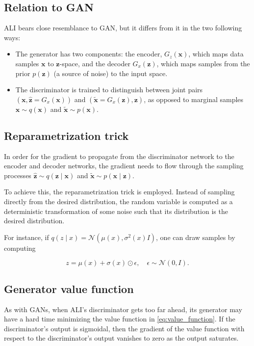 \documentclass{article}
\begin{document}
\subsection{Relation to GAN}
ALI bears close resemblance to GAN, but it differs from it in the two following
ways:

\begin{itemize}
	\item The generator has two components: the encoder, $G_z(\bm{x})$, which
		maps data samples $\bm{x}$ to $\bm{z}$-space, and the decoder
		$G_x(\bm{z})$, which maps samples from the prior $p(\bm{z})$ (a source
		of noise) to the input space.
	\item The discriminator is trained to distinguish between joint pairs
		$(\bm{x}, \hat{\bm{z}} = G_x(\bm{x}))$ and $(\tilde{\bm{x}} =
		G_x(\bm{z}), \bm{z})$, as opposed to marginal samples $\bm{x} \sim
		q(\bm{x})$ and $\tilde{\bm{x}} \sim p(\bm{x})$.
\end{itemize}


\subsection{Reparametrization trick}
In order for the gradient to propagate from the discriminator network to the
encoder and decoder networks, the gradient needs to flow through the sampling
processes $\hat{\bm{z}} \sim q(\bm{z} \mid \bm{x})$ and $\tilde{\bm{x}} \sim
p(\bm{x} \mid \bm{z})$.

To achieve this, the reparametrization trick
\citep{kingma2013fast,bengio2013deep,bengio2013estimating} is employed. Instead
of sampling directly from the desired distribution, the random variable is
computed as a deterministic transformation of some noise such that its
distribution is the desired distribution.

For instance, if $q(z \mid x) = \mathcal{N}(\mu(x), \sigma^2(x)I)$, one can
draw samples by computing

\begin{equation}
    z = \mu(x) + \sigma(x) \odot \epsilon, \quad
    \epsilon \sim \mathcal{N}(0, I).
\end{equation}

\subsection{Generator value function}

As with GANs, when ALI's discriminator gets too far ahead, its generator may
have a hard time minimizing the value function in \autoref{eq:value_function}.
If the discriminator's output is sigmoidal, then the gradient of the value
function with respect to the discriminator's output vanishes to zero as the
output saturates.
\end{document}
